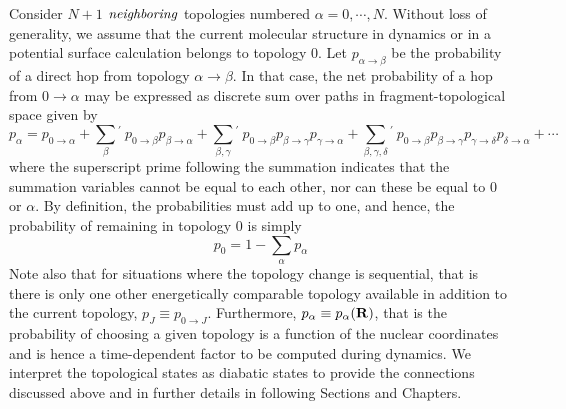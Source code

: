 Consider $N+1$ $\it{neighboring}$  topologies numbered
$\alpha=0,\cdots,N$.  Without loss of generality, we assume that the current molecular structure 
in dynamics or in a potential surface calculation belongs to topology $0$. Let
$p_{\alpha \rightarrow \beta}$ be the
probability of a direct hop from topology $\alpha \rightarrow \beta$. In that case, the
net probability of a hop from $0 \rightarrow \alpha$ may be expressed as discrete sum over
paths in fragment-topological space given by
\begin{equation}
p_\alpha = p_{0 \rightarrow \alpha} + \sum_{\beta}{}^{\prime} ~p_{0 \rightarrow \beta} p_{\beta \rightarrow \alpha} +
\sum_{\beta,\gamma}{}^\prime ~p_{0 \rightarrow \beta} p_{\beta \rightarrow \gamma} p_{\gamma \rightarrow \alpha} +
\sum_{\beta,\gamma,\delta}{}^\prime ~p_{0 \rightarrow \beta} p_{\beta \rightarrow \gamma} p_{\gamma \rightarrow \delta} p_{\delta
  \rightarrow \alpha} +
\cdots
\label{pJ}
\end{equation}
where the superscript prime following the summation indicates that the
summation variables cannot be equal to each other, nor can these be equal to $0$ or
$\alpha$. By definition, the probabilities must add
up to one, and hence, the probability of remaining in topology $0$ is simply 
\begin{equation}
p_0 = 1 - \sum_\alpha p_\alpha
\label{p0}
\end{equation}
Note also that for situations where the topology change is sequential, that
is there is only one other energetically comparable topology available in
addition to the current topology, $p_J \equiv p_{0 \rightarrow J}$.
Furthermore, $p_\alpha \equiv p_\alpha({\bf R})$, that is the probability of choosing a
given topology is a function of the nuclear coordinates and is hence a
time-dependent factor to be computed during dynamics. We interpret the topological
states as diabatic states to provide the connections discussed above and in further
details in following Sections and Chapters.


